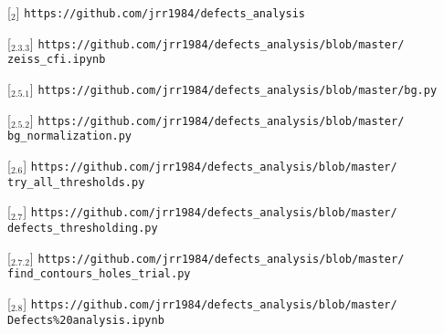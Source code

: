 \singlespacing
{}
\label{chap:gitrefs}



[\href{https://github.com/jrr1984/defects\_analysis}{\faGithub$_{2}$}] \texttt{https://github.com/jrr1984/defects\_analysis}

[\href{https://github.com/jrr1984/defects\_analysis/blob/master/zeiss\_cfi.ipynb}{\faGithub$_{2.3.3}$}] \texttt{https://github.com/jrr1984/defects\_analysis/blob/master/\\\hspace{1.5cm}zeiss\_cfi.ipynb}

[\href{https://github.com/jrr1984/defects\_analysis/blob/master/bg.py}{\faGithub$_{2.5.1}$}] \texttt{https://github.com/jrr1984/defects\_analysis/blob/master/bg.py}

[\href{https://github.com/jrr1984/defects\_analysis/blob/master/bg\_normalization.py}{\faGithub$_{2.5.2}$}] \texttt{https://github.com/jrr1984/defects\_analysis/blob/master/\\\hspace{1.5cm}bg\_normalization.py}

[\href{https://github.com/jrr1984/defects\_analysis/blob/master/try\_all\_thresholds.py}{\faGithub$_{2.6}$}] \texttt{https://github.com/jrr1984/defects\_analysis/blob/master/\\\hspace{1.5cm}try\_all\_thresholds.py}

[\href{https://github.com/jrr1984/defects\_analysis/blob/master/defects\_thresholding.py}{\faGithub$_{2.7}$}] \texttt{https://github.com/jrr1984/defects\_analysis/blob/master/\\\hspace{1.5cm}defects\_thresholding.py}

[\href{https://github.com/jrr1984/defects\_analysis/blob/master/find\_contours\_holes\_trial.py}{\faGithub$_{2.7.2}$}] \texttt{https://github.com/jrr1984/defects\_analysis/blob/master/\\\hspace{1.5cm}find\_contours\_holes\_trial.py}

[\href{https://github.com/jrr1984/defects\_analysis/blob/master/Defects\%20analysis.ipynb}{\faGithub$_{2.8}$}] \texttt{https://github.com/jrr1984/defects\_analysis/blob/master/\\\hspace{1.5cm}Defects\%20analysis.ipynb}

